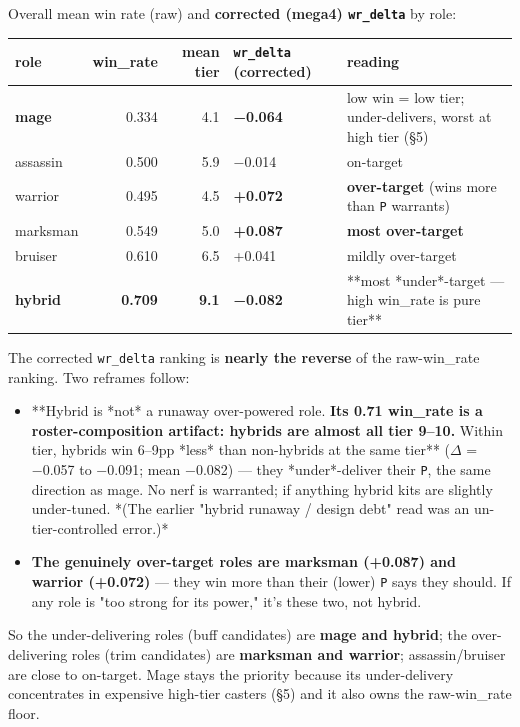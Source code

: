 \documentclass[10pt]{article}
\begin{document}
Overall mean win rate (raw) and \textbf{corrected (mega4) \texttt{wr\_\allowbreak{}delta}} by role:\\

\medskip
\begin{tabularx}{\linewidth}{LrrLL}
\toprule
\textbf{role} & \textbf{win\_rate} & \textbf{mean tier} & \textbf{\texttt{wr\_\allowbreak{}delta} (corrected)} & \textbf{reading} \\
\midrule
\textbf{mage} & 0.334 & 4.1 & \textbf{−0.064} & low win = low tier; under-delivers, worst at high tier (\S{}5) \\
assassin & 0.500 & 5.9 & −0.014 & on-target \\
warrior & 0.495 & 4.5 & \textbf{+0.072} & \textbf{over-target} (wins more than \texttt{P} warrants) \\
marksman & 0.549 & 5.0 & \textbf{+0.087} & \textbf{most over-target} \\
bruiser & 0.610 & 6.5 & +0.041 & mildly over-target \\
\textbf{hybrid} & \textbf{0.709} & \textbf{9.1} & \textbf{−0.082} & **most *under*-target --- high win\_rate is pure tier** \\
\bottomrule
\end{tabularx}
\medskip

The corrected \texttt{wr\_\allowbreak{}delta} ranking is \textbf{nearly the reverse} of the raw-win\_rate ranking. Two reframes follow:\\

\begin{itemize}
\item **Hybrid is *not* a runaway over-powered role.\textbf{ Its 0.71 win\_rate is a roster-composition artifact: hybrids are almost all tier 9--10. }Within tier, hybrids win 6--9pp *less* than non-hybrids at the same tier** ($\Delta$ = −0.057 to −0.091; mean −0.082) --- they *under*-deliver their \texttt{P}, the same direction as mage. No nerf is warranted; if anything hybrid kits are slightly under-tuned. *(The earlier "hybrid runaway / design debt" read was an un-tier-controlled error.)*
\item \textbf{The genuinely over-target roles are marksman (+0.087) and warrior (+0.072)} --- they win more than their (lower) \texttt{P} says they should. If any role is "too strong for its power," it's these two, not hybrid.
\end{itemize}

So the under-delivering roles (buff candidates) are \textbf{mage and hybrid}; the over-delivering roles (trim candidates) are \textbf{marksman and warrior}; assassin/bruiser are close to on-target. Mage stays the priority because its under-delivery concentrates in expensive high-tier casters (\S{}5) and it also owns the raw-win\_rate floor.\\
\end{document}
